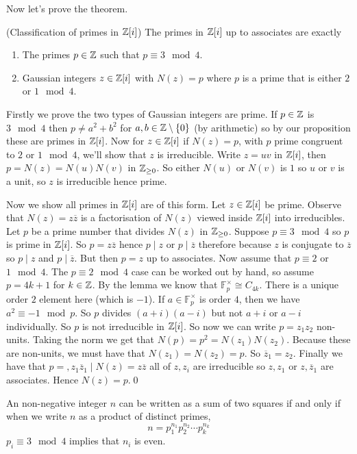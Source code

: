 \documentclass{article}
\begin{document}
Now let's prove the theorem.
\begin{theorem}
	(Classification of primes in $ \mathbb{Z}[i] $) The primes in $ \mathbb{Z}[i] $ up to associates are exactly
	\begin{enumerate}
		\item The primes $ p\in\mathbb{Z} $ such that $ p\equiv 3 \mod 4 $.
		\item Gaussian integers $ z\in \mathbb{Z}[i] $ with $ N(z)=p $ where $ p $ is a prime that is either $ 2 $ or $ 1 \mod 4$.
	\end{enumerate}
\end{theorem}
\pf Firstly we prove the two types of Gaussian integers are prime. If $ p\in \mathbb{Z} $ is $ 3\mod 4 $ then $ p\ne a^2+b^2 $ for $ a,b\in \mathbb{Z}\setminus \{0\} $ (by arithmetic) so by our proposition these are primes in $ \mathbb{Z}[i] $. Now for $ z\in\mathbb{Z}[i] $ if $ N(z)=p $, with $ p $ prime congruent to $ 2 $ or $ 1 \mod 4 $, we'll show that $ z $ is irreducible. Write $ z=uv $ in $ \mathbb{Z}[i] $, then $ p=N(z)=N(u)N(v) $ in $ \mathbb{Z}_{\ge 0 } $. So either $ N(u) $ or $ N(v) $ is $ 1 $ so $ u $ or $ v $ is a unit, so $ z $ is irreducible hence prime.\par
Now we show all primes in $ \mathbb{Z}[i] $ are of this form. Let $ z\in \mathbb{Z}[i] $ be prime. Observe that $ N(z)=z\overline z $ is a factorisation of $ N(z) $ viewed inside $ \mathbb{Z}[i] $ into irreducibles. Let $ p $ be a prime number that divides $ N(z) $ in $ \mathbb{Z}_{\ge 0} $. Suppose $ p\equiv 3\mod 4 $ so $ p $ is prime in $ \mathbb{Z}[i] $. So $ p=z\overline z $ hence $ p\mid z $ or $ p\mid \overline z $ therefore because $ z $ is conjugate to $ \overline z $ so $ p\mid z$ and $ p\mid \overline z $. But then $ p=z $ up to associates. Now assume that $ p\equiv 2 $ or $ 1\mod 4 $. The $ p\equiv 2 \mod 4 $ case can be worked out by hand, so assume $ p=4k+1 $ for $ k \in \mathbb{Z} $. By the lemma we know that $ \mathbb F_p^\times \cong C_{4k} $. There is a unique order $ 2 $ element here (which is $ -1 $). If $ a\in \mathbb F_p^\times $ is order $ 4 $, then we have $ a^2\equiv -1\mod p $. So $ p $ divides $ (a+i)(a-i) $ but not $ a+i $ or $ a-i $ individually. So $ p $ is not irreducible in $ \mathbb{Z}[i] $. So now we can write $ p=z_1z_2 $ non-units. Taking the norm we get that $ N(p)=p^2=N(z_1)N(z_2) $. Because these are non-units, we must have that $ N(z_1)=N(z_2)=p $. So $ \overline z_1=z_2 $. Finally we have that $ p= , z_1\overline z_1\mid N(z)=z\overline z $ all of $ z,z_i $ are irreducible so $ z,z_1 $ or $ z,\overline z_1 $ are associates. Hence $ N(z)=p. $\qed
\begin{corollary}
  An non-negative integer $ n $ can be written as a sum of two squares if and only if when we write $ n $ as a product of distinct primes,
  \[
	  n=p_1^{n_1}p_2^{n_2}\cdots p_k^{n_k}
  \]
  $ p_i\equiv 3\mod 4 $ implies that $ n_i $ is even.
\end{corollary}
\end{document}
